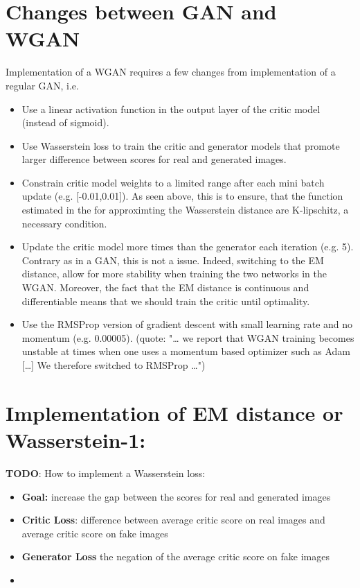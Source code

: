 \documentclass{article}
\begin{document}
\section{Changes between GAN and WGAN}

Implementation of a WGAN requires a few changes from implementation of a regular GAN, i.e. 

\begin{itemize}
    \item Use a linear activation function in the output layer of the critic model (instead of sigmoid).
    \item Use Wasserstein loss to train the critic and generator models that promote larger difference between scores for real and generated images. 
    \item Constrain critic model weights to a limited range after each mini batch update (e.g. [-0.01,0.01]). As seen above, this is to ensure, that the function estimated in the for approximting the Wasserstein distance are K-lipschitz, a necessary condition.
    \item Update the critic model more times than the generator each iteration (e.g. 5). Contrary as in a GAN, this is not a issue. Indeed, switching to the EM distance, allow for more stability when training the two networks in the WGAN. Moreover, the fact that the EM distance is continuous and differentiable means that we should train the critic until optimality.
    \item Use the RMSProp version of gradient descent with small learning rate and no momentum (e.g. 0.00005). (quote: "… we report that WGAN training becomes unstable at times when one uses a momentum based optimizer such as Adam […] We therefore switched to RMSProp …")
    
\end{itemize}
 

\section{Implementation of EM distance or Wasserstein-1:}

\textbf{TODO}: How to implement a Wasserstein loss:

\begin{itemize}
    \item \textbf{Goal:} increase the gap between the scores for real and generated images
    \item \textbf{Critic Loss}: difference between average critic score on real images and average critic score on fake images
    \item \textbf{Generator Loss} the negation of the average critic score on fake images
    \item 
\end{itemize}



%

 
\end{document}
